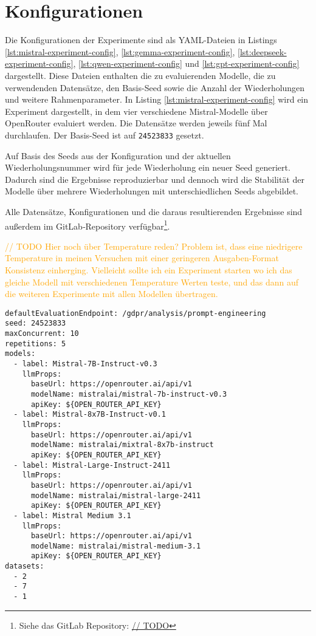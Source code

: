 \section{Konfigurationen}\label{sec:konfigurationen}

Die Konfigurationen der Experimente sind als YAML-Dateien in Listings \ref{lst:mistral-experiment-config}, \ref{lst:gemma-experiment-config}, \ref{lst:deepseek-experiment-config}, \ref{lst:qwen-experiment-config} und \ref{lst:gpt-experiment-config} dargestellt. Diese Dateien enthalten die zu evaluierenden Modelle, die zu verwendenden Datensätze, den Basis-Seed sowie die Anzahl der Wiederholungen und weitere Rahmenparameter. In Listing \ref{lst:mistral-experiment-config} wird ein Experiment dargestellt, in dem vier verschiedene Mistral-Modelle über OpenRouter evaluiert werden. Die Datensätze werden jeweils fünf Mal durchlaufen. Der Basis-Seed ist auf \texttt{24523833} gesetzt.

Auf Basis des Seeds aus der Konfiguration und der aktuellen Wiederholungsnummer wird für jede Wiederholung ein neuer Seed generiert. Dadurch sind die Ergebnisse reproduzierbar und dennoch wird die Stabilität der Modelle über mehrere Wiederholungen mit unterschiedlichen Seeds abgebildet.

Alle Datensätze, Konfigurationen und die daraus resultierenden
Ergebnisse sind außerdem im GitLab‑Repository verfügbar\footnote{Siehe das GitLab Repository: \hyperlink{https://gitlab.com/andreaskonrad/bpmn-gdpr-llm-evaluation}{// TODO}}.

\textcolor{orange}{// TODO Hier noch über Temperature reden? Problem ist, dass eine niedrigere Temperature in meinen Versuchen mit einer geringeren Ausgaben-Format Konsistenz einherging. Vielleicht sollte ich ein Experiment starten wo ich das gleiche Modell mit verschiedenen Temperature Werten teste, und das dann auf die weiteren Experimente mit allen Modellen übertragen.}

\begin{lstlisting}[caption={Konfigurationsdatei des Experiments mit Mistral Modellen}, label={lst:mistral-experiment-config}]
defaultEvaluationEndpoint: /gdpr/analysis/prompt-engineering
seed: 24523833
maxConcurrent: 10
repetitions: 5
models:
  - label: Mistral-7B-Instruct-v0.3
    llmProps:
      baseUrl: https://openrouter.ai/api/v1
      modelName: mistralai/mistral-7b-instruct-v0.3
      apiKey: ${OPEN_ROUTER_API_KEY}
  - label: Mistral-8x7B-Instruct-v0.1
    llmProps:
      baseUrl: https://openrouter.ai/api/v1
      modelName: mistralai/mixtral-8x7b-instruct
      apiKey: ${OPEN_ROUTER_API_KEY}
  - label: Mistral-Large-Instruct-2411
    llmProps:
      baseUrl: https://openrouter.ai/api/v1
      modelName: mistralai/mistral-large-2411
      apiKey: ${OPEN_ROUTER_API_KEY}
  - label: Mistral Medium 3.1
    llmProps:
      baseUrl: https://openrouter.ai/api/v1
      modelName: mistralai/mistral-medium-3.1
      apiKey: ${OPEN_ROUTER_API_KEY}
datasets:
  - 2
  - 7
  - 1
\end{lstlisting}